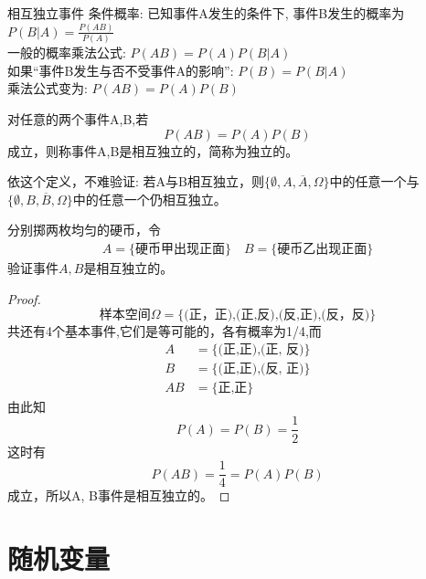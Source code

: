 \begin{frame}{相互独立事件}
条件概率: 已知事件A发生的条件下, 事件B发生的概率为$P(B|A)=\frac{P(AB)}{P(A)}$\\
一般的概率乘法公式: $P(AB)=P(A)P(B|A)$\\
如果``事件B发生与否不受事件A的影响'': $P(B)=P(B|A)$\\
乘法公式变为: $P(AB)=P(A)P(B)$
\begin{definition}
对任意的两个事件A,B,若
\[P(AB)=P(A)P(B)\]
成立，则称事件A,B是相互独立的，简称为独立的。	
\end{definition}
\begin{block}{依这个定义，不难验证:}
	若A与B相互独立，则$\{\emptyset,A,\overline{A},\Omega\}$中的任意一个与$\{\emptyset,B,\overline{B},\Omega\}$中的任意一个仍相互独立。
\end{block}
\end{frame}

\begin{frame}[shrink]
		分别掷两枚均匀的硬币，令
		\begin{align*}
		A=\{\text{硬币甲出现正面} \}\quad	B=\{\text{硬币乙出现正面} \}
		\end{align*}
		验证事件$A,B$是相互独立的。
 \begin{proof}
			$$\text{样本空间}\Omega=\{\text{(正，正),(正,反),(反,正),(反，反)}\} $$
			共还有4个基本事件,它们是等可能的，各有概率为1/4,而
			\begin{align*}
			A&=\{\text{(正,正),(正, 反)}\} \\
			B&=\{\text{(正,正),(反, 正)}\} \\
			AB&=\{\text{正,正}\}
			\end{align*}
			由此知 \[P(A)=P(B)=\frac{1}{2}\]
			这时有 \[P(AB)=\frac{1}{4}=P(A)P(B)\]
			成立，所以A, B事件是相互独立的。
 \end{proof}
\end{frame}

\section{随机变量}

